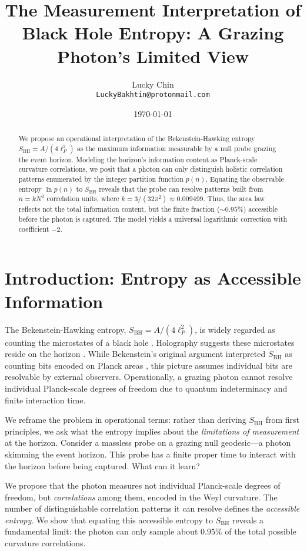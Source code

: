 \documentclass[12pt, letterpaper]{article}
\title{The Measurement Interpretation of Black Hole Entropy: A Grazing Photon's Limited View}
\author{Lucky Chin \\ \normalsize \texttt{LuckyBakhtin@protonmail.com}}
\date{\today}
\begin{document}
\maketitle

\begin{abstract}
We propose an operational interpretation of the Bekenstein-Hawking entropy $S_{\mathrm{BH}} = A/(4\ell_P^2)$ as the maximum information measurable by a null probe grazing the event horizon. Modeling the horizon's information content as Planck-scale curvature correlations, we posit that a photon can only distinguish holistic correlation patterns enumerated by the integer partition function $p(n)$. Equating the observable entropy $\ln p(n)$ to $S_{\mathrm{BH}}$ reveals that the probe can resolve patterns built from $n = k N^2$ correlation units, where $k = 3/(32\pi^2) \approx 0.009499$. Thus, the area law reflects not the total information content, but the finite fraction ($\sim 0.95\%$) accessible before the photon is captured. The model yields a universal logarithmic correction with coefficient $-2$.
\end{abstract}

\section{Introduction: Entropy as Accessible Information}

The Bekenstein-Hawking entropy, $S_{\mathrm{BH}} = A/(4\ell_P^2)$, is widely regarded as counting the microstates of a black hole \cite{bekenstein1973, hawking1975}. Holography suggests these microstates reside on the horizon \cite{thooft1993, susskind1995}. While Bekenstein's original argument interpreted $S_{\mathrm{BH}}$ as counting bits encoded on Planck areas \cite{bekenstein1973}, this picture assumes individual bits are resolvable by external observers. Operationally, a grazing photon cannot resolve individual Planck-scale degrees of freedom due to quantum indeterminacy and finite interaction time.

We reframe the problem in operational terms: rather than deriving $S_{\mathrm{BH}}$ from first principles, we ask what the entropy implies about the \emph{limitations of measurement} at the horizon. Consider a massless probe on a grazing null geodesic—a photon skimming the event horizon. This probe has a finite proper time to interact with the horizon before being captured. What can it learn?

We propose that the photon measures not individual Planck-scale degrees of freedom, but \emph{correlations} among them, encoded in the Weyl curvature. The number of distinguishable correlation patterns it can resolve defines the \emph{accessible entropy}. We show that equating this accessible entropy to $S_{\mathrm{BH}}$ reveals a fundamental limit: the photon can only sample about $0.95\%$ of the total possible curvature correlations.
\end{document}

